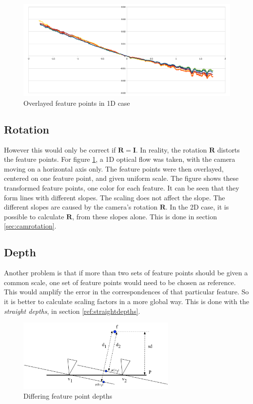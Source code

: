 \documentclass{scrreprt}
\newcommand{\matr}[1]{\mathbf{#1}}
\begin{document}
\begin{figure}
\centering
\includegraphics[width=\textwidth]{onedimslopes.pdf}
\caption{Overlayed feature points in 1D case}
\label{fig:onedimslopes}
\end{figure}

\subsection{Rotation}
However this would only be correct if $\matr{R} = \matr{I}$. In reality, the rotation $\matr{R}$ distorts the feature points. For figure \ref{fig:onedimslopes}, a 1D optical flow was taken, with the camera moving on a horizontal axis only. The feature points were then overlayed, centered on one feature point, and given uniform scale. The figure shows these transformed feature points, one color for each feature. It can be seen that they form lines with different slopes. The scaling does not affect the slope. The different slopes are caused by the camera's rotation $\matr{R}$. In the 2D case, it is possible to calculate $\matr{R}$, from these slopes alone. This is done in section \ref{sec:camrotation}.

\subsection{Depth}
Another problem is that if more than two sets of feature points should be given a common scale, one set of feature points would need to be chosen as reference. This would amplify the error in the correspondences of that particular feature. So it is better to calculate scaling factors in a more global way. This is done with the \emph{straight depths}, in section \ref{ref:straightdepths}.

\begin{figure}
\centering
\includegraphics[width=0.7\textwidth]{differentdepths.pdf}
\caption{Differing feature point depths}
\label{fig:differentdepths}
\end{figure}
\end{document}
